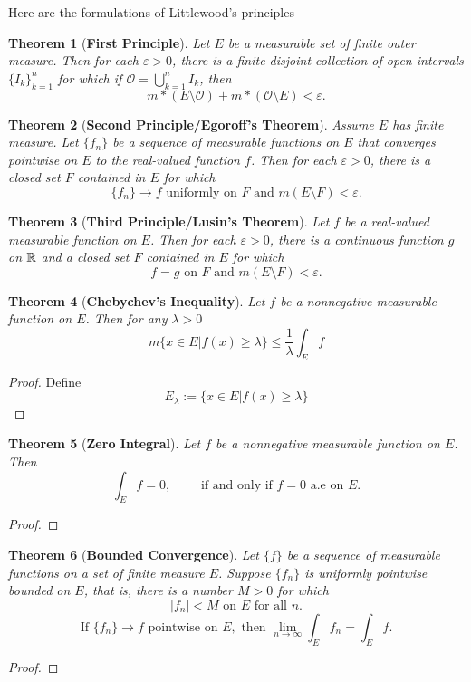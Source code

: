 \documentclass[	DIV=calc,paper=a4,fontsize=11pt]{scrartcl}	 	%
\newtheorem{thm}{Theorem}[section]
\theoremstyle{definition}
\theoremstyle{plain}
\theoremstyle{remark}
\begin{document}
\noindent Here are the formulations of Littlewood's principles
\begin{thm}[\textbf{First Principle}]
Let $E$ be a measurable set of finite outer measure. Then for each $\varepsilon> 0$, there is a finite disjoint collection of open intervals $\{I_k\}_{k=1}^n$ for which if $\mathcal{O}=\bigcup_{k=1}^n I_k$, then
\[m*(E\setminus\mathcal{O})+m*(\mathcal{O}\setminus E) <\varepsilon.\]
\end{thm}
\begin{thm}[\textbf{Second Principle/Egoroff's Theorem}]
Assume $E$ has finite measure. Let $\{f_n\}$ be a sequence of measurable functions on $E$ that converges pointwise on $E$ to the real-valued function $f$. Then for each $\varepsilon> 0$, there is a closed set $F$ contained in $E$ for which
\[\{f_n\}\to f \text{ uniformly on } F \text{ and } m(E\setminus F) <\varepsilon.\]
\end{thm}
\begin{thm}[\textbf{Third Principle/Lusin's Theorem}]
Let $f$ be a real-valued measurable function on $E$. Then for each $\varepsilon> 0$, there is a continuous function $g$ on $\Bbb R$ and a closed set $F$ contained in $E$ for which
\[ f =g \text{ on } F \text{ and } m(E\setminus F)<\varepsilon.\]
\end{thm}
\begin{thm}[\textbf{Chebychev's Inequality}]
Let $f$ be a nonnegative measurable function on $E$. Then for any $\lambda>0$
\[m\{x\in E| f(x)\ge \lambda\}\le \frac{1}{\lambda}\int_E f\]
\end{thm}
\begin{proof}
Define
\[E_{\lambda}:=\{x\in E| f(x)\ge \lambda\}\]

\end{proof}
\begin{thm}[\textbf{Zero Integral}]
Let $f$ be a nonnegative measurable function on $E$. Then
\[\int_E f=0,\qquad \text{ if and only if } f=0 \text{ a.e on } E.\]
\end{thm}
\begin{proof}

\end{proof}
\begin{thm}[\textbf{Bounded Convergence}]
Let $\{f\}$ be a sequence of measurable functions on a set of finite measure $E$. Suppose $\{f_n\}$ is uniformly pointwise bounded on $E$, that is, there is a number $M > 0$ for which
\[|f_n|< M \text{ on } E \text{ for all } n.\]
\[\text{If } \{f_n\}\to f \text{ pointwise on } E, \text{ then } \lim_{n\to \infty} \int_E f_n=\int_E f.\]
\end{thm}
\begin{proof}

\end{proof}
\end{document}
